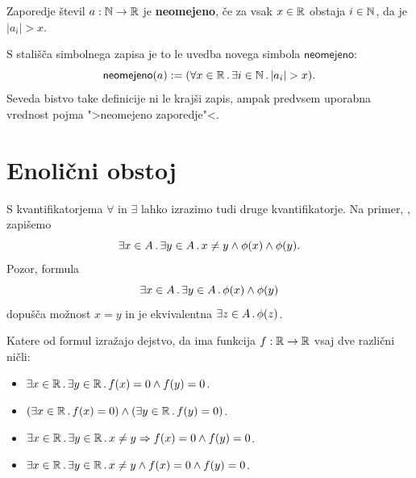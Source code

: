 \begin{definicija}
  Zaporedje števil $a : \mathbb{N} \to \mathbb{R}$ je \textbf{neomejeno}, če za vsak $x \in \mathbb{R}$ obstaja $i \in \mathbb{N}$, da je $|a_i| > x$.
\end{definicija}

\noindent
S stališča simbolnega zapisa je to le uvedba novega simbola $\mathsf{neomejeno}$:
%
\begin{equation*}
  \mathsf{neomejeno}(a) \mathrel{{:}{=}} (\forall x \in \mathbb{R} \,.\, \exists i \in \mathbb{N} \,.\, |a_i| > x).
\end{equation*}
%
Seveda bistvo take definicije ni le krajši zapis, ampak predvsem uporabna vrednost pojma ">neomejeno zaporedje"<.

\section{Enolični obstoj}
\label{sec:enolicni-obstoj}

S kvantifikatorjema $\forall$ in $\exists$ lahko izrazimo tudi druge kvantifikatorje.
Na primer, , zapišemo
%
\begin{equation*}
    \exists x \in A \,.\, \exists y \in A \,.\, x \neq y \land \phi(x) \land \phi(y).
\end{equation*}
%
Pozor, formula
%
\begin{equation*}
    \exists x \in A \,.\, \exists y \in A \,.\, \phi(x) \land \phi(y)
\end{equation*}
%
dopušča možnost $x = y$ in je ekvivalentna $\exists z \in A \,.\, \phi(z)$.

\begin{vaja}
  Katere od formul izražajo dejstvo, da ima funkcija $f : \mathbb{R} \to \mathbb{R}$ vsaj dve različni ničli:
  \begin{itemize}
  \item $\exists x \in \mathbb{R} \,.\, \exists y \in \mathbb{R} \,.\, f(x) = 0 \land f(y) = 0$.
  \item $(\exists x \in \mathbb{R} \,.\, f(x) = 0) \land (\exists y \in \mathbb{R} \,.\, f(y) = 0)$.
  \item $\exists x \in \mathbb{R} \,.\, \exists y \in \mathbb{R} \,.\, x \neq y \Rightarrow f(x) = 0 \land f(y) = 0$.
  \item $\exists x \in \mathbb{R} \,.\, \exists y \in \mathbb{R} \,.\, x \neq y \land f(x) = 0 \land f(y) = 0$.
  \end{itemize}
\end{vaja}

